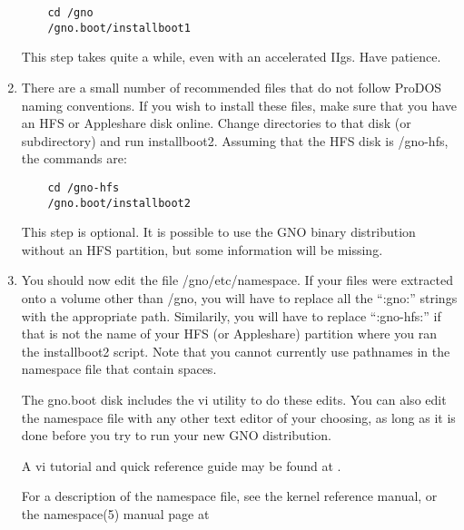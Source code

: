 \documentclass{report}
\begin{document}
\begin{enumerate}
\begin{verbatim}
	cd /gno
	/gno.boot/installboot1
\end{verbatim}

This step takes quite a while, even with an accelerated IIgs.
Have patience.

\item
There are a small number of recommended files that do not follow
ProDOS naming conventions.  If you wish to install these files,
make sure that you have an HFS or Appleshare disk online. Change
directories to that disk (or subdirectory) and run installboot2.
Assuming that the HFS disk is /gno-hfs, the commands are:

\begin{verbatim}
	cd /gno-hfs
	/gno.boot/installboot2
\end{verbatim}

This step is optional.  It is possible to use the GNO binary
distribution without an HFS partition, but some information
will be missing.

\item
You should now edit the file /gno/etc/namespace.  If your
files were extracted onto a volume other than /gno, you will
have to replace all the ``:gno:'' strings with the appropriate
path.  Similarily, you will have to replace ``:gno-hfs:'' if
that is not the name of your HFS (or Appleshare) partition
where you ran the installboot2 script.  Note that you cannot
currently use pathnames in the namespace file that contain spaces.

The gno.boot disk includes the vi utility to do these edits.
You can also edit the namespace file with any other text editor
of your choosing, as long as it is done before you try to run
your new GNO distribution.

A vi tutorial and quick reference guide may be found at
.

\begin{comment}
You may want to put /usr onto a different partition; it will
get fairly large over time.

If you have a RAM disk, you should consider having it renamed
to /tmp using renram5(8) or mktmp(8), in which case its entry
should be removed from the namespace file.

\end{comment}
For a description of the namespace file, see the kernel
reference manual, or the namespace(5) manual page at


\end{enumerate}
\end{document}
